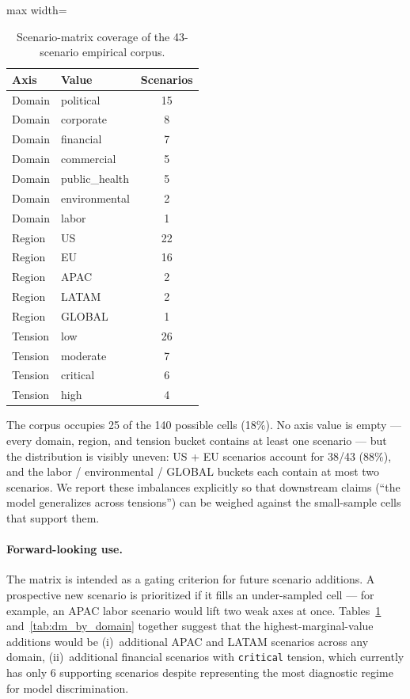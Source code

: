 \documentclass[12pt]{article}
\begin{document}
\begin{table}[H]
\centering
\caption{Scenario-matrix coverage of the 43-scenario empirical corpus.}
\label{tab:matrix_cov}
\begin{adjustbox}{max width=\textwidth}
\begin{tabular}{@{}llc@{}}
\toprule
Axis & Value & Scenarios \\
\midrule
Domain & political & 15 \\
Domain & corporate &  8 \\
Domain & financial &  7 \\
Domain & commercial &  5 \\
Domain & public\_health &  5 \\
Domain & environmental &  2 \\
Domain & labor &  1 \\
\midrule
Region & US & 22 \\
Region & EU & 16 \\
Region & APAC & 2 \\
Region & LATAM & 2 \\
Region & GLOBAL & 1 \\
\midrule
Tension & low & 26 \\
Tension & moderate & 7 \\
Tension & critical & 6 \\
Tension & high & 4 \\
\bottomrule
\end{tabular}
\end{adjustbox}
\end{table}

The corpus occupies 25 of the 140 possible cells (18\%). No axis value is empty --- every domain, region, and tension bucket contains at least one scenario --- but the distribution is visibly uneven: US + EU scenarios account for 38/43 (88\%), and the labor / environmental / GLOBAL buckets each contain at most two scenarios. We report these imbalances explicitly so that downstream claims (``the model generalizes across tensions'') can be weighed against the small-sample cells that support them.

\paragraph{Forward-looking use.} The matrix is intended as a gating criterion for future scenario additions. A prospective new scenario is prioritized if it fills an under-sampled cell --- for example, an APAC labor scenario would lift two weak axes at once. Tables~\ref{tab:matrix_cov} and~\ref{tab:dm_by_domain} together suggest that the highest-marginal-value additions would be (i)~additional APAC and LATAM scenarios across any domain, (ii)~additional financial scenarios with \texttt{critical} tension, which currently has only 6 supporting scenarios despite representing the most diagnostic regime for model discrimination.
\end{document}
